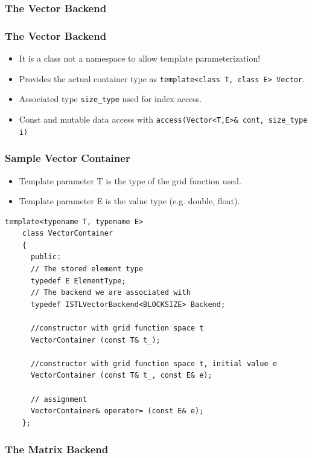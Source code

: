 \subsubsection{The Vector Backend}
\label{sec:vector-backend}

\begin{frame}
  \frametitle<presentation>{The Vector Backend}
  \begin{itemize}
  \item It is a class not a namespace to allow template parameterization!
  \item Provides the actual container type as
    \lstinline!template<class T, class E> Vector!.
  \item Associated type \lstinline!size_type! used for index access.
  \item Const and mutable data access with 
    \lstinline!access(Vector<T,E>& cont, size_type i)!
  \end{itemize}
\end{frame}

\begin{frame}[fragile]
  \frametitle{Sample Vector Container}
  \begin{itemize}
  \item Template parameter T is the type of the grid function used.
  \item Template parameter E is the value type (e.g. double, float).
  \end{itemize}
  \begin{lstlisting}[basicstyle=\scriptsize]
    template<typename T, typename E>
    class VectorContainer 
    {
      public:
      // The stored element type
      typedef E ElementType;
      // The backend we are associated with
      typedef ISTLVectorBackend<BLOCKSIZE> Backend;
      
      //constructor with grid function space t
      VectorContainer (const T& t_);

      //constructor with grid function space t, initial value e
      VectorContainer (const T& t_, const E& e);
      
      // assignment
      VectorContainer& operator= (const E& e);
    };
  \end{lstlisting}
\end{frame}
\subsubsection{The Matrix Backend}
\label{sec:matrix-backend}

